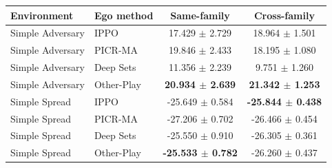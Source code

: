 \begin{tabular}{llcc}
\toprule
Environment & Ego method & Same-family & Cross-family \\
\midrule
Simple Adversary & IPPO & 17.429 $\pm$ 2.729 & 18.964 $\pm$ 1.501 \\
Simple Adversary & PICR-MA & 19.846 $\pm$ 2.433 & 18.195 $\pm$ 1.080 \\
Simple Adversary & Deep Sets & 11.356 $\pm$ 2.239 & 9.751 $\pm$ 1.260 \\
Simple Adversary & Other-Play & \textbf{20.934 $\pm$ 2.639} & \textbf{21.342 $\pm$ 1.253} \\
Simple Spread & IPPO & -25.649 $\pm$ 0.584 & \textbf{-25.844 $\pm$ 0.438} \\
Simple Spread & PICR-MA & -27.206 $\pm$ 0.702 & -26.466 $\pm$ 0.454 \\
Simple Spread & Deep Sets & -25.550 $\pm$ 0.910 & -26.305 $\pm$ 0.361 \\
Simple Spread & Other-Play & \textbf{-25.533 $\pm$ 0.782} & -26.260 $\pm$ 0.437 \\
\bottomrule
\end{tabular}

